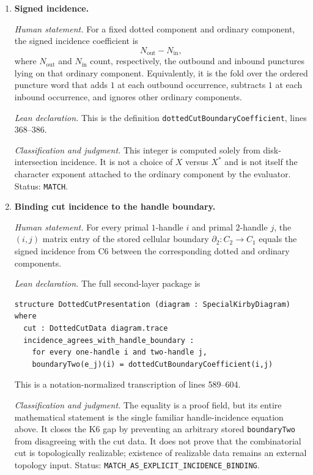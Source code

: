 \begin{enumerate}[label=\textbf{C\arabic*.},leftmargin=*]
\emph{Lean declaration.}
\texttt{DottedCutData.punctureWord} is a noncomputable definition at lines
347--355.  Projector completeness, recorded order, exact ports, and unchanged
exterior context are theorems proved at lines 357--574, notably
\nolinkurl{projectorEventsExactlyMatchDottedComponents}.

\emph{Classification and judgment.}
These consequences are kernel-checked theorems of C3--C4, not axioms or
additional proof fields.  Thus the evaluator cannot silently choose a second
puncture order.  Status: \texttt{DERIVED}.

\item \textbf{Signed incidence.}

\emph{Human statement.}
For a fixed dotted component and ordinary component, the signed incidence
coefficient is
\[
 N_{\mathrm{out}}-N_{\mathrm{in}},
\]
where $N_{\mathrm{out}}$ and $N_{\mathrm{in}}$ count, respectively, the
outbound and inbound punctures lying on that ordinary component.  Equivalently,
it is the fold over the ordered puncture word that adds $1$ at each outbound
occurrence, subtracts $1$ at each inbound occurrence, and ignores other
ordinary components.

\emph{Lean declaration.}
This is the definition \texttt{dottedCutBoundaryCoefficient}, lines 368--386.

\emph{Classification and judgment.}
This integer is computed solely from disk-intersection incidence.  It is not a
choice of $X$ versus $X^*$ and is not itself the character exponent attached
to the ordinary component by the evaluator.  Status: \texttt{MATCH}.

\item \textbf{Binding cut incidence to the handle boundary.}

\emph{Human statement.}
For every primal $1$-handle $i$ and primal $2$-handle $j$, the $(i,j)$ matrix
entry of the stored cellular boundary
$\partial_2\colon C_2\to C_1$ equals the signed incidence from C6 between the
corresponding dotted and ordinary components.

\emph{Lean declaration.}
The full second-layer package is
\begin{verbatim}
structure DottedCutPresentation (diagram : SpecialKirbyDiagram) where
  cut : DottedCutData diagram.trace
  incidence_agrees_with_handle_boundary :
    for every one-handle i and two-handle j,
    boundaryTwo(e_j)(i) = dottedCutBoundaryCoefficient(i,j)
\end{verbatim}
This is a notation-normalized transcription of lines 589--604.

\emph{Classification and judgment.}
The equality is a proof field, but its entire mathematical statement is the
single familiar handle-incidence equation above.  It closes the K6 gap by
preventing an arbitrary stored \texttt{boundaryTwo} from disagreeing with the
cut data.  It does not prove that the combinatorial cut is topologically
realizable; existence of realizable data remains an external topology input.
Status: \nolinkurl{MATCH_AS_EXPLICIT_INCIDENCE_BINDING}.

\end{enumerate}

